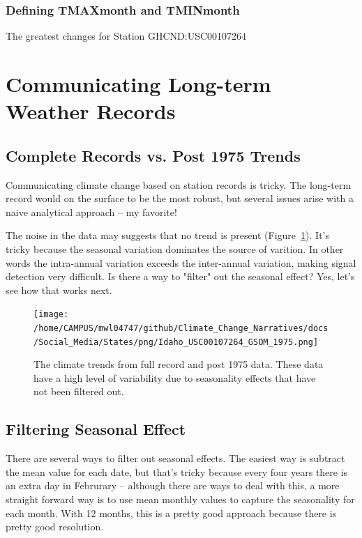 \documentclass{article}\usepackage[]{graphicx}\usepackage[]{color}
\begin{document}
\subsubsection{Defining TMAXmonth and TMINmonth}


The greatest changes for Station GHCND:USC00107264

\section{Communicating Long-term Weather Records}

\subsection{Complete Records vs. Post 1975 Trends}

Communicating climate change based on station records is tricky. The long-term record would on the surface to be the most robust, but several issues arise with a naive analytical approach -- my favorite!



The noise in the data may suggests that no trend is present (Figure~\ref{fig:GSOM-1975trend}). It's tricky because the seasonal variation dominates the source of varition. In other words the intra-annual variation exceeds the inter-annual variation, making signal detection very difficult. Is there a way to "filter" out the seasonal effect? Yes, let's see how that works next. 

\begin{figure}
\texttt{[image: /home/CAMPUS/mwl04747/github/Climate\_Change\_Narratives/docs/Social\_Media/States/png/Idaho\_USC00107264\_GSOM\_1975.png]}
\caption{The climate trends from full record and post 1975 data. These data have a high level of variability due to seasonality effects that have not been filtered out.}
\label{fig:GSOM-1975trend}
\end{figure}


\subsection{Filtering Seasonal Effect}

There are several ways to filter out seasonal effects. The easiest way is subtract the mean value for each date, but that's tricky because every four years there is an extra day in Februrary -- although there are ways to deal with this, a more straight forward way is to use mean monthly values to capture the seasonality for each month. With 12 months, this is a pretty good approach because there is pretty good resolution. 
\end{document}
